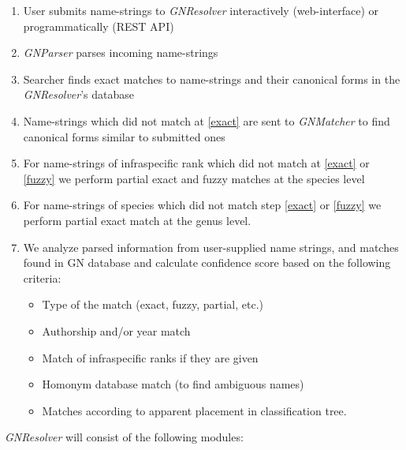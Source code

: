 \documentclass[11pt]{article}
\begin{document}
\begin{enumerate}[label=\textbf{Step \arabic*}]

  \item User submits name-strings to \textit{GNResolver} interactively
    (web-interface) or programmatically (REST API)

  \item \textit{GNParser} parses incoming name-strings

  \item \label{exact} Searcher finds exact matches to name-strings and
    their canonical forms in the \textit{GNResolver}'s database

  \item \label{fuzzy} Name-strings which did not match at \ref{exact} are
    sent to \textit{GNMatcher} to find canonical forms similar to submitted
    ones

  \item For name-strings of infraspecific rank which did not match at
    \ref{exact} or \ref{fuzzy} we perform partial exact and fuzzy matches at
    the species level

  \item For name-strings of species which did not match step \ref{exact} or
    \ref{fuzzy} we perform partial exact match at the genus level.

  \item We analyze parsed information from user-supplied name strings, and
    matches found in GN database and calculate confidence score
    based on the following criteria:
    \begin{itemize}
      \item Type of the match (exact, fuzzy, partial, etc.)
      \item Authorship and/or year match
      \item Match of infraspecific ranks if they are given
      \item Homonym database match (to find ambiguous names)
      \item Matches according to apparent placement in classification tree.
    \end{itemize}
\end{enumerate}

\textit{GNResolver} will consist of the following modules:
\end{document}

